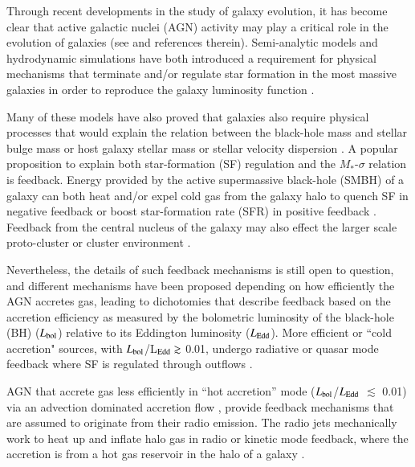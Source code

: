 Through recent developments in the study of galaxy evolution, it has become clear that active galactic nuclei (AGN) activity may play a critical role in the evolution of galaxies (see \citealt{heckman2014} and references therein). Semi-analytic models and hydrodynamic simulations have both introduced a requirement for physical mechanisms that terminate and/or regulate star formation in the most massive galaxies in order to reproduce the galaxy luminosity function \citep[e.g.][]{im2002,wolf2003,mauch2007,siana2008,yuan2016}. 

Many of these models have also proved that galaxies also require physical processes that would explain the relation between the black-hole mass and stellar bulge mass or host galaxy stellar mass \citep[$M_{\rm{BH}}$-$M_{\rm bulge}$ or $M_{\rm{BH}}$-$M_*$ relation; e.g.][]{miyoshi1995,kormendy2013} or stellar velocity dispersion \citep[$M_{\rm{BH}}$-$\sigma$ relation; e.g.][]{ferrarese2000,gebhardt2000}. A popular proposition to explain both star-formation (SF) regulation and the $M_*$-$\sigma$ relation is feedback. Energy provided by the active supermassive black-hole (SMBH) of a galaxy can both heat and/or expel cold gas from the galaxy halo to quench SF in negative feedback \citep[e.g.][]{springel2005,dimatteo2005,croton2006,bower2006,hopkins2006,ciotti2010} or boost star-formation rate (SFR) in positive feedback \citep[e.g][]{ishibashi2012,zinn2013,silk2013}. Feedback from the central nucleus of the galaxy may also effect the larger scale proto-cluster or cluster environment \citep{RawlingsJarvis2004}. 

Nevertheless, the details of such feedback mechanisms is still open to question, and different mechanisms have been proposed depending on how efficiently the AGN accretes gas, leading to dichotomies that describe feedback based on the accretion efficiency as measured by the bolometric luminosity of the black-hole (BH) ($L_{\rm{bol}}$) relative to its Eddington luminosity ($L_{\rm{Edd}}$). More efficient or ``cold accretion" sources, with $L_{\rm{bol}}$/L$_{\rm{Edd}} \gtrsim$ 0.01, undergo radiative or quasar mode feedback where SF is regulated through outflows \citep[e.g.][]{fischer2010,greene2011,sturm2011,veilleux2013,spoon2013,liu2013,cicone2014}. 

AGN that accrete gas less efficiently in ``hot accretion'' mode ($L_{\rm{bol}}$/$L_{\rm{Edd}}$ $\lesssim$ 0.01) via an advection dominated accretion flow \cite[ADAF;][]{heckman2014}, provide feedback mechanisms that are assumed to originate from their radio emission. The radio jets mechanically work to heat up and inflate halo gas in radio or kinetic mode feedback, where the accretion is from a hot gas reservoir in the halo of a galaxy \citep[e.g.][]{fabian2003,fabian2006,best2006}. 

